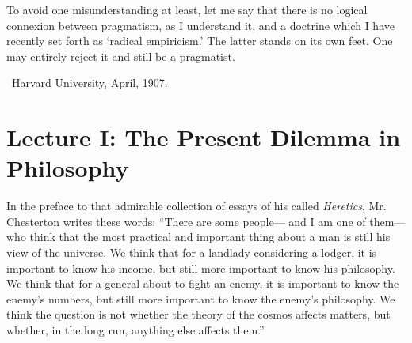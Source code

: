 \documentclass[]{article}
\begin{document}



To avoid one misunderstanding at least, let me say that there is no logical connexion between pragmatism, as I understand it, and a doctrine
which I have recently set forth as `radical empiricism.' The latter
stands on its own feet. One may entirely reject it and still be a
pragmatist.

~\hfill Harvard University, April, 1907.


\section*{Lecture I: The Present Dilemma in Philosophy}

In the preface to that admirable collection of essays of his called
\emph{Heretics}, Mr. Chesterton writes these words: ``There are some
people--- and I am one of them--- who think that the most practical and
important thing about a man is still his view of the universe. We think
that for a landlady considering a lodger, it is important to know his
income, but still more important to know his philosophy. We think that
for a general about to fight an enemy, it is important to know
the enemy's numbers, but still more important to know the enemy's
philosophy. We think the question is not whether the theory of the
cosmos affects matters, but whether, in the long run, anything else
affects them.''
\end{document}
